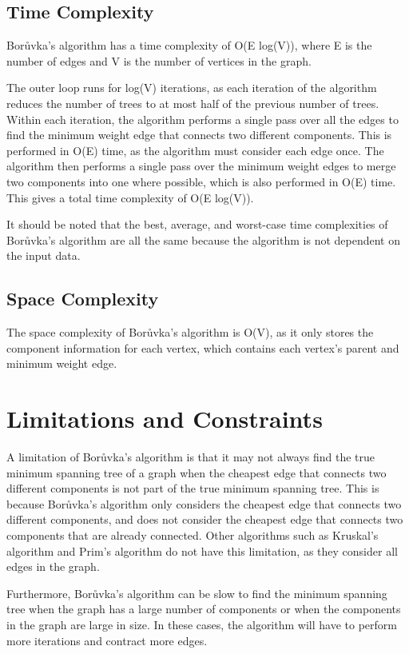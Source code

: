 \documentclass[a4paper, 11pt]{article}
\begin{document}
\subsection{Time Complexity}
Borůvka's algorithm has a time complexity of O(E log(V)), where E is the number of edges and V is the number of vertices in the graph.

The outer loop runs for log(V) iterations, as each iteration of the algorithm reduces the number of trees to at most half of the previous number of trees. Within each iteration, the algorithm performs a single pass over all the edges to find the minimum weight edge that connects two different components. This is performed in O(E) time, as the algorithm must consider each edge once. The algorithm then performs a single pass over the minimum weight edges to merge two components into one where possible, which is also performed in O(E) time. This gives a total time complexity of O(E log(V)).

It should be noted that the best, average, and worst-case time complexities of Borůvka's algorithm are all the same because the algorithm is not dependent on the input data.

\subsection{Space Complexity}
The space complexity of Borůvka's algorithm is O(V), as it only stores the component information for each vertex, which contains each vertex's parent and minimum weight edge.

\section{Limitations and Constraints}
A limitation of Borůvka's algorithm is that it may not always find the true minimum spanning tree of a graph when the cheapest edge that connects two different components is not part of the true minimum spanning tree. This is because Borůvka's algorithm only considers the cheapest edge that connects two different components, and does not consider the cheapest edge that connects two components that are already connected. Other algorithms such as Kruskal's algorithm and Prim's algorithm do not have this limitation, as they consider all edges in the graph.

Furthermore, Borůvka's algorithm can be slow to find the minimum spanning tree when the graph has a large number of components or when the components in the graph are large in size. In these cases, the algorithm will have to perform more iterations and contract more edges.
\end{document}
